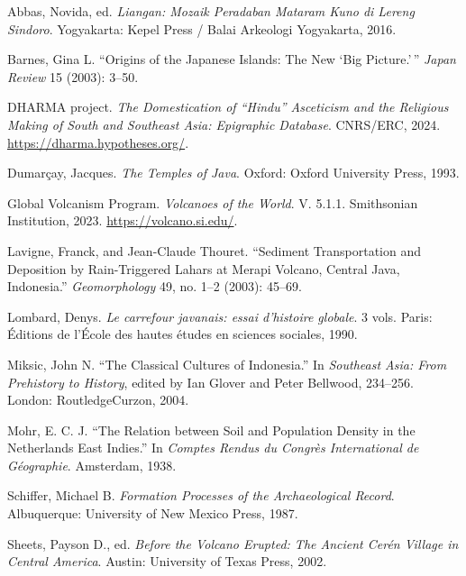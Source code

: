 \documentclass[12pt,a4paper]{article}
\begin{document}
\noindent Abbas, Novida, ed. \emph{Liangan: Mozaik Peradaban Mataram Kuno di Lereng Sindoro}. Yogyakarta: Kepel Press / Balai Arkeologi Yogyakarta, 2016.

\vspace{0.5em}
\noindent Barnes, Gina L. ``Origins of the Japanese Islands: The New `Big Picture.'\,'' \emph{Japan Review} 15 (2003): 3--50.

\vspace{0.5em}
\noindent DHARMA project. \emph{The Domestication of ``Hindu'' Asceticism and the Religious Making of South and Southeast Asia: Epigraphic Database}. CNRS/ERC, 2024. \url{https://dharma.hypotheses.org/}.

\vspace{0.5em}
\noindent Dumar\c{c}ay, Jacques. \emph{The Temples of Java}. Oxford: Oxford University Press, 1993.

\vspace{0.5em}
\noindent Global Volcanism Program. \emph{Volcanoes of the World}. V. 5.1.1. Smithsonian Institution, 2023. \url{https://volcano.si.edu/}.

\vspace{0.5em}
\noindent Lavigne, Franck, and Jean-Claude Thouret. ``Sediment Transportation and Deposition by Rain-Triggered Lahars at Merapi Volcano, Central Java, Indonesia.'' \emph{Geomorphology} 49, no. 1--2 (2003): 45--69.

\vspace{0.5em}
\noindent Lombard, Denys. \emph{Le carrefour javanais: essai d'histoire globale}. 3 vols. Paris: \'{E}ditions de l'\'{E}cole des hautes \'{e}tudes en sciences sociales, 1990.

\vspace{0.5em}
\noindent Miksic, John N. ``The Classical Cultures of Indonesia.'' In \emph{Southeast Asia: From Prehistory to History}, edited by Ian Glover and Peter Bellwood, 234--256. London: RoutledgeCurzon, 2004.

\vspace{0.5em}
\noindent Mohr, E. C. J. ``The Relation between Soil and Population Density in the Netherlands East Indies.'' In \emph{Comptes Rendus du Congr\`{e}s International de G\'{e}ographie}. Amsterdam, 1938.

\vspace{0.5em}
\noindent Schiffer, Michael B. \emph{Formation Processes of the Archaeological Record}. Albuquerque: University of New Mexico Press, 1987.

\vspace{0.5em}
\noindent Sheets, Payson D., ed. \emph{Before the Volcano Erupted: The Ancient Cer\'{e}n Village in Central America}. Austin: University of Texas Press, 2002.
\end{document}
